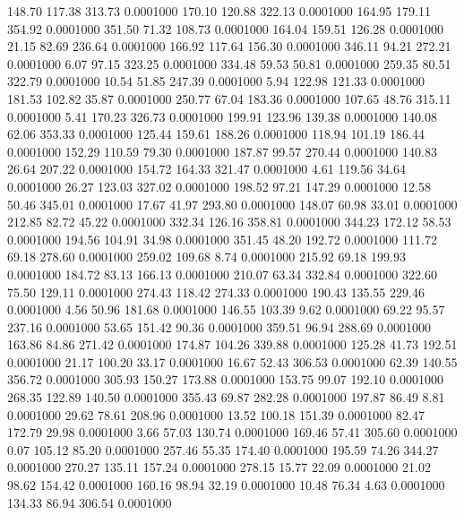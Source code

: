  148.70  117.38  313.73   0.0001000
 170.10  120.88  322.13   0.0001000
 164.95  179.11  354.92   0.0001000
 351.50   71.32  108.73   0.0001000
 164.04  159.51  126.28   0.0001000
  21.15   82.69  236.64   0.0001000
 166.92  117.64  156.30   0.0001000
 346.11   94.21  272.21   0.0001000
   6.07   97.15  323.25   0.0001000
 334.48   59.53   50.81   0.0001000
 259.35   80.51  322.79   0.0001000
  10.54   51.85  247.39   0.0001000
   5.94  122.98  121.33   0.0001000
 181.53  102.82   35.87   0.0001000
 250.77   67.04  183.36   0.0001000
 107.65   48.76  315.11   0.0001000
   5.41  170.23  326.73   0.0001000
 199.91  123.96  139.38   0.0001000
 140.08   62.06  353.33   0.0001000
 125.44  159.61  188.26   0.0001000
 118.94  101.19  186.44   0.0001000
 152.29  110.59   79.30   0.0001000
 187.87   99.57  270.44   0.0001000
 140.83   26.64  207.22   0.0001000
 154.72  164.33  321.47   0.0001000
   4.61  119.56   34.64   0.0001000
  26.27  123.03  327.02   0.0001000
 198.52   97.21  147.29   0.0001000
  12.58   50.46  345.01   0.0001000
  17.67   41.97  293.80   0.0001000
 148.07   60.98   33.01   0.0001000
 212.85   82.72   45.22   0.0001000
 332.34  126.16  358.81   0.0001000
 344.23  172.12   58.53   0.0001000
 194.56  104.91   34.98   0.0001000
 351.45   48.20  192.72   0.0001000
 111.72   69.18  278.60   0.0001000
 259.02  109.68    8.74   0.0001000
 215.92   69.18  199.93   0.0001000
 184.72   83.13  166.13   0.0001000
 210.07   63.34  332.84   0.0001000
 322.60   75.50  129.11   0.0001000
 274.43  118.42  274.33   0.0001000
 190.43  135.55  229.46   0.0001000
   4.56   50.96  181.68   0.0001000
 146.55  103.39    9.62   0.0001000
  69.22   95.57  237.16   0.0001000
  53.65  151.42   90.36   0.0001000
 359.51   96.94  288.69   0.0001000
 163.86   84.86  271.42   0.0001000
 174.87  104.26  339.88   0.0001000
 125.28   41.73  192.51   0.0001000
  21.17  100.20   33.17   0.0001000
  16.67   52.43  306.53   0.0001000
  62.39  140.55  356.72   0.0001000
 305.93  150.27  173.88   0.0001000
 153.75   99.07  192.10   0.0001000
 268.35  122.89  140.50   0.0001000
 355.43   69.87  282.28   0.0001000
 197.87   86.49    8.81   0.0001000
  29.62   78.61  208.96   0.0001000
  13.52  100.18  151.39   0.0001000
  82.47  172.79   29.98   0.0001000
   3.66   57.03  130.74   0.0001000
 169.46   57.41  305.60   0.0001000
   0.07  105.12   85.20   0.0001000
 257.46   55.35  174.40   0.0001000
 195.59   74.26  344.27   0.0001000
 270.27  135.11  157.24   0.0001000
 278.15   15.77   22.09   0.0001000
  21.02   98.62  154.42   0.0001000
 160.16   98.94   32.19   0.0001000
  10.48   76.34    4.63   0.0001000
 134.33   86.94  306.54   0.0001000
